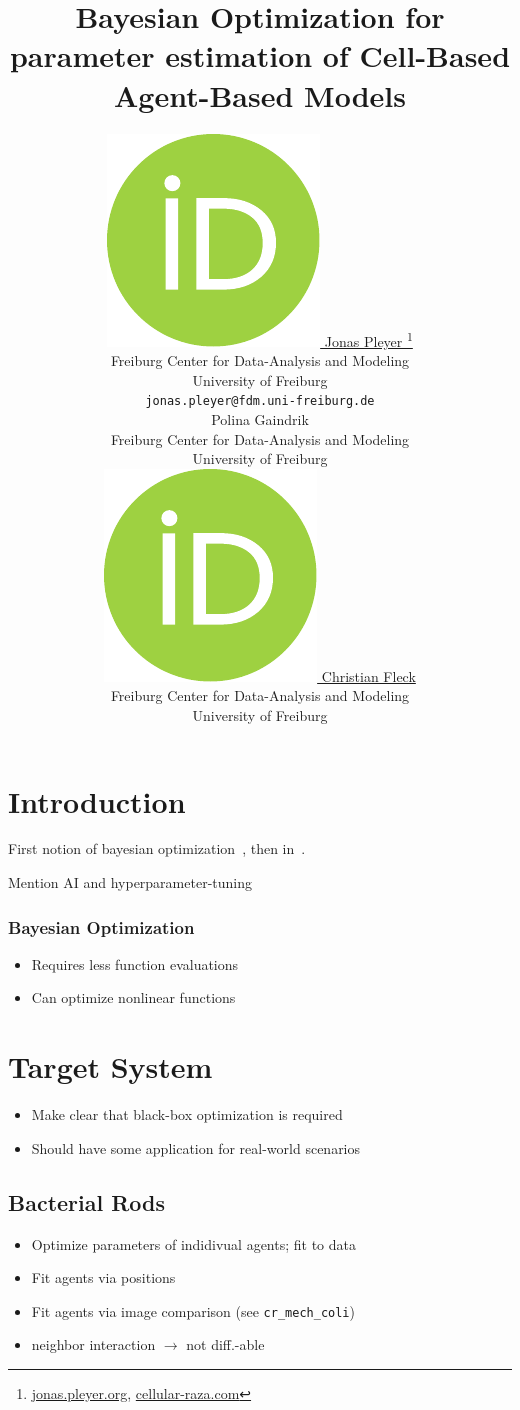 \documentclass{article}
\title{Bayesian Optimization for parameter estimation of Cell-Based Agent-Based Models}
\author{
    \href{https://orcid.org/0009-0001-0613-7978}{
        \includegraphics[scale=0.06]{orcid.pdf}
        \hspace{1mm}Jonas Pleyer
    }
    \thanks{
        \href{https://jonas.pleyer.org}{jonas.pleyer.org},
        \href{https://cellular-raza.com}{cellular-raza.com}
    }\\
	Freiburg Center for Data-Analysis and Modeling\\
	University of Freiburg\\
	\texttt{jonas.pleyer@fdm.uni-freiburg.de} \\
	\And
    Polina Gaindrik\\
	Freiburg Center for Data-Analysis and Modeling\\
	University of Freiburg\\
	\And
	\href{https://orcid.org/0000-0002-6371-4495}{
        \includegraphics[scale=0.06]{orcid.pdf}
        \hspace{1mm}Christian Fleck
    }\\
	Freiburg Center for Data-Analysis and Modeling\\
	University of Freiburg
}
\begin{document}
\maketitle

\begin{abstract}
\end{abstract}



\section{Introduction}
\label{section:introduction}
First notion of bayesian optimization~\cite{Kushner1964}, then in~\cite{Mockus1978}.

Mention AI and hyperparameter-tuning

\subsubsection*{Bayesian Optimization}
\begin{itemize}
    \item Requires less function evaluations
    \item Can optimize nonlinear functions
\end{itemize}

\section{Target System}
\label{section:target-system}
\begin{itemize}
    \item Make clear that black-box optimization is required
    \item Should have some application for real-world scenarios
\end{itemize}

\subsection{Bacterial Rods}
\label{subsection:bacterial-rods}
\begin{itemize}
    \item Optimize parameters of indidivual agents; fit to data
    \item Fit agents via positions
    \item Fit agents via image comparison (see \texttt{cr\_mech\_coli})
    \item neighbor interaction $\rightarrow$ not diff.-able
\end{itemize}
\end{document}
